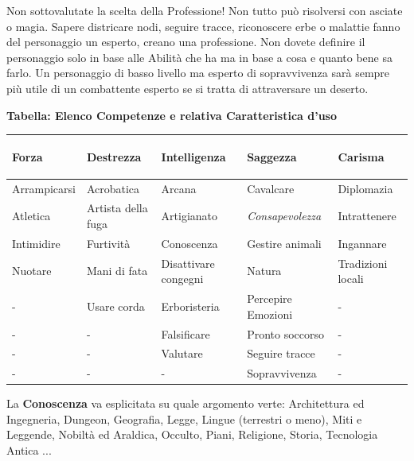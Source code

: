 \begin{multicols}{2}
\begin{changemargin}{0.3cm}{0.3cm}\begin{tcolorbox}[title = Professione ???]
Non sottovalutate la scelta della Professione! Non tutto può risolversi con asciate o magia. Sapere districare nodi, seguire tracce, riconoscere erbe o malattie fanno del personaggio un esperto, creano una professione. Non dovete definire il personaggio solo in base alle Abilità che ha ma in base a cosa e quanto bene sa farlo. Un personaggio di basso livello ma esperto di sopravvivenza sarà sempre più utile di un combattente esperto se si tratta di attraversare un deserto.\end{tcolorbox}\end{changemargin}

\end{multicols}

\medskip

\textbf{Tabella: Elenco Competenze e relativa Caratteristica d'uso}

\medskip

\begin{tabular}{lllll}\label{competenzeelenco}\hypertarget{competenzeelenco}{}
\textbf{Forza} & \textbf{Destrezza} & \textbf{Intelligenza} & \textbf{Saggezza} & \textbf{Carisma}\\
\toprule
Arrampicarsi	& Acrobatica		& Arcana		&Cavalcare				& Diplomazia \\
Atletica		& Artista della fuga& Artigianato 	&\emph{Consapevolezza} 	& Intrattenere \\
Intimidire		& Furtività 		& Conoscenza	&Gestire animali		& Ingannare \\
Nuotare 		& Mani di fata		& Disattivare congegni &Natura			& Tradizioni locali \\
- & Usare corda	& Erboristeria		& Percepire Emozioni & - \\
- & -				& Falsificare		& Pronto soccorso	 & - \\
- & -				& Valutare			& Seguire tracce	 & - \\
- & -		        & -        			& Sopravvivenza      & - \\

\end{tabular}

\medskip

La \textbf{Conoscenza} va esplicitata su quale argomento verte: Architettura ed Ingegneria, Dungeon, Geografia, Legge, Lingue (terrestri o meno), Miti e Leggende, Nobiltà ed Araldica, Occulto, Piani, Religione, Storia, Tecnologia Antica ...

